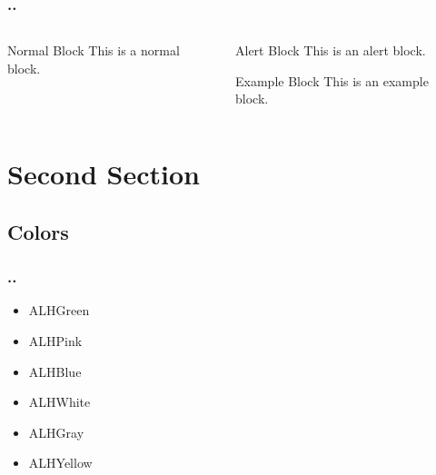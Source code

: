 \documentclass[ignorenonframetext,14pt]{beamer}
\begin{document}
\begin{frame}
    \frametitle{\insertsectionnumber.\insertsubsectionnumber. \insertsubsectionhead}

    \begin{columns}
        \begin{column}{.5\textwidth}
            \begin{block}{Normal Block}
                This is a normal block.
            \end{block}
        \end{column}
        \begin{column}{.5\textwidth}
            \begin{alertblock}{Alert Block}
                This is an alert block.
            \end{alertblock}
            \begin{exampleblock}{Example Block}
                This is an example block.
            \end{exampleblock}
        \end{column}
    \end{columns}

\end{frame}

\section{Second Section}

\subsection{Colors}

\begin{frame}
    \frametitle{\insertsectionnumber.\insertsubsectionnumber. \insertsubsectionhead}
    \begin{itemize}
        \item \textcolor{ALHGreen}{ALHGreen}
        \item \textcolor{ALHPink}{ALHPink}
        \item \textcolor{ALHBlue}{ALHBlue}
        \item \textcolor{ALHWhite}{ALHWhite}
        \item \textcolor{ALHGray}{ALHGray}
        \item \textcolor{ALHYellow}{ALHYellow}
    \end{itemize}

\end{frame}
\end{document}
